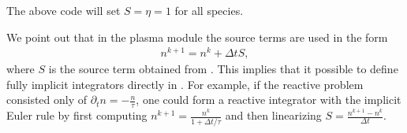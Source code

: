 \documentclass[letterpaper,10pt,english]{sphinxmanual}
\begin{document}
\begin{sphinxVerbatim}[commandchars=\\\{\},formatcom=\scriptsize]
            
                                              
                                          
                                      
                                          
                                              
                                              
                                                  
                                                  
                                                  
                                                    
      
      
\end{sphinxVerbatim}

The above code will set \(S = \eta = 1\) for all species.

We point out that in the plasma module the source terms are  used in the form
\begin{equation*}
\begin{split}n^{k+1} = n^k + \Delta t S,\end{split}
\end{equation*}
where \(S\) is the source term obtained from .
This implies that it  possible to define fully implicit integrators directly in .
For example, if the reactive problem consisted only of \(\partial_t n = -\frac{n}{\tau}\), one could form a reactive integrator with the implicit Euler rule by first computing \(n^{k+1} = \frac{n^k}{1 + \Delta t/\tau}\) and then linearizing \(S = \frac{n^{k+1} - n^k}{\Delta t}\).
\end{document}
